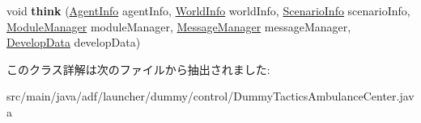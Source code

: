 \begin{DoxyCompactItemize}
\item 
\hypertarget{classadf_1_1launcher_1_1dummy_1_1control_1_1DummyTacticsAmbulanceCenter_af6dbefc0ad86950c245ce54bb415c435}{}\label{classadf_1_1launcher_1_1dummy_1_1control_1_1DummyTacticsAmbulanceCenter_af6dbefc0ad86950c245ce54bb415c435} 
void {\bfseries think} (\hyperlink{classadf_1_1agent_1_1info_1_1AgentInfo}{Agent\+Info} agent\+Info, \hyperlink{classadf_1_1agent_1_1info_1_1WorldInfo}{World\+Info} world\+Info, \hyperlink{classadf_1_1agent_1_1info_1_1ScenarioInfo}{Scenario\+Info} scenario\+Info, \hyperlink{classadf_1_1agent_1_1module_1_1ModuleManager}{Module\+Manager} module\+Manager, \hyperlink{classadf_1_1agent_1_1communication_1_1MessageManager}{Message\+Manager} message\+Manager, \hyperlink{classadf_1_1agent_1_1develop_1_1DevelopData}{Develop\+Data} develop\+Data)
\end{DoxyCompactItemize}


このクラス詳解は次のファイルから抽出されました\+:\begin{DoxyCompactItemize}
\item 
src/main/java/adf/launcher/dummy/control/Dummy\+Tactics\+Ambulance\+Center.\+java\end{DoxyCompactItemize}
